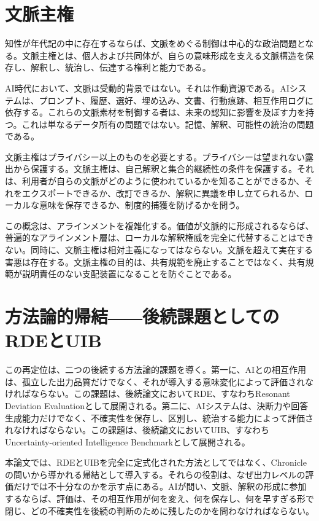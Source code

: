 \documentclass[11pt,a4paper]{ltjsarticle}
\begin{document}
\section{文脈主権}

知性が年代記の中に存在するならば、文脈をめぐる制御は中心的な政治問題となる。文脈主権とは、個人および共同体が、自らの意味形成を支える文脈構造を保存し、解釈し、統治し、伝達する権利と能力である。

AI時代において、文脈は受動的背景ではない。それは作動資源である。AIシステムは、プロンプト、履歴、選好、埋め込み、文書、行動痕跡、相互作用ログに依存する。これらの文脈素材を制御する者は、未来の認知に影響を及ぼす力を持つ。これは単なるデータ所有の問題ではない。記憶、解釈、可能性の統治の問題である\parencite{zuboff2019surveillance}。

文脈主権はプライバシー以上のものを必要とする。プライバシーは望まれない露出から保護する。文脈主権は、自己解釈と集合的継続性の条件を保護する。それは、利用者が自らの文脈がどのように使われているかを知ることができるか、それをエクスポートできるか、改訂できるか、解釈に異議を申し立てられるか、ローカルな意味を保存できるか、制度的捕獲を防げるかを問う。

この概念は、アラインメントを複雑化する。価値が文脈的に形成されるならば、普遍的なアラインメント層は、ローカルな解釈権威を完全に代替することはできない。同時に、文脈主権は相対主義になってはならない。文脈を超えて実在する害悪は存在する。文脈主権の目的は、共有規範を廃止することではなく、共有規範が説明責任のない支配装置になることを防ぐことである。

\section{方法論的帰結――後続課題としてのRDEとUIB}

この再定位は、二つの後続する方法論的課題を導く。第一に、AIとの相互作用は、孤立した出力品質だけでなく、それが導入する意味変化によって評価されなければならない。この課題は、後続論文においてRDE、すなわちResonant Deviation Evaluationとして展開される。第二に、AIシステムは、決断力や回答生成能力だけでなく、不確実性を保存し、区別し、統治する能力によって評価されなければならない。この課題は、後続論文においてUIB、すなわちUncertainty-oriented Intelligence Benchmarkとして展開される。

本論文では、RDEとUIBを完全に定式化された方法としてではなく、Chronicleの問いから導かれる帰結として導入する。それらの役割は、なぜ出力レベルの評価だけでは不十分なのかを示す点にある。AIが問い、文脈、解釈の形成に参加するならば、評価は、その相互作用が何を変え、何を保存し、何を早すぎる形で閉じ、どの不確実性を後続の判断のために残したのかを問わなければならない。
\end{document}
